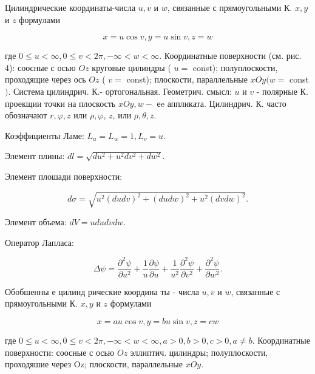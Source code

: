 \documentclass[10pt]{article}
\begin{document}
Цилиндрические координаты-числа $u, v$ и $w$, связанные с прямоугольными К. $x, y$ и $z$ формулами



\[

x=u \cos v, y=u \sin v, z=w

\]



где $0 \leqslant u<\infty, 0 \leqslant v<2 \pi,-\infty<w<\infty$. Координатные поверхности (см. рис. 4): соосные с осью $O z$ круговые цилиндры ( $u=$ const); полуплоскости, проходящие через ось $O z$ ( $v=$ const); плоскости, параллельные $x O y(w=$ const $)$. Система цилиндрич. К.- ортогональная. Геометрич. смысл: $u$ и $v$ - полярные К. проекщии точки на плоскость $x O y, w-$ еe аппликата. Цилиндрич. К. часто обозначают $r, \varphi, z$ или $\rho, \varphi$, $z$, или $\rho, \theta, z$.



Коэффициенты Ламе: $L_{u}=L_{w}=1, L_{v}=u$.



Элемент плины: $d l=\sqrt{d u^{2}+u^{2} d v^{2}+d w^{2}}$.



Элемент плошади поверхности:



\[

d \sigma=\sqrt{u^{2}(d u d v)^{2}+(d u d w)^{2}+u^{2}(d v d w)^{2}} .

\]



Элемент объема: $d V=u d u d v d w$.



Оператор Лапласа:



\[

\Delta \psi=\frac{\partial^{2} \psi}{\partial u^{2}}+\frac{1}{u} \frac{\partial \psi}{\partial u}+\frac{1}{u^{2}} \frac{\partial^{2} \psi}{\partial v^{2}}+\frac{\partial^{2} \psi}{\partial w^{2}} .

\]



Обобшенны е цилинд рические координа ты - числа $u, v$ и $w$, связанные с прямоугольными К. $x, y$ и $z$ формулами



\[

x=a u \cos v, y=b u \sin v, z=c w

\]



где $0 \leqslant u<\infty, 0 \leqslant v<2 \pi,-\infty<w<\infty, a>0, b>0, c>0, a \neq b$. Координатные поверхности: соосные с осью $O z$ эллиптич. цилиндры; полуплоскости, проходяшие через Oz; плоскости, параллельные $x O y$.
\end{document}
